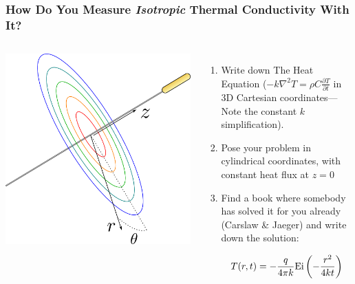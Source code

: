 \documentclass{beamer}
\begin{document}
\begin{frame}
\frametitle{How Do You Measure \emph{Isotropic} Thermal Conductivity With It?}

\begin{columns}[c]
    \includegraphics[width=\textwidth]{fig/basic_geometry.png}
    \begin{enumerate}
    \item Write down The Heat Equation (\( -k\nabla^2 T = \rho C\frac{\partial T}{\partial t} \) in 3D Cartesian coordinates---Note the constant \(k\)
    simplification).
    \item Pose your problem in cylindrical coordinates, with constant heat flux at \(z=0\)
    \item Find a book where somebody has solved it for you already
    (Carslaw \& Jaeger) and write down the solution:

    \begin{equation*}
    T(r,t) = -\frac{q}{4\pi k}\textrm{Ei}\left(-\frac{r^2}{4kt}\right)
    \end{equation*}

    \end{enumerate}
\end{columns}
\end{frame}
\end{document}
